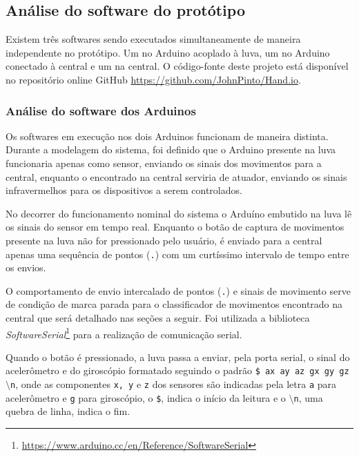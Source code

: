 \subsection{Análise do software do protótipo}

Existem três softwares sendo executados simultaneamente de maneira independente no protótipo. Um no Arduino acoplado à luva, um no Arduino conectado à central e um na central. O código-fonte deste projeto está disponível no repositório online GitHub \url{https://github.com/JohnPinto/Hand.io}.

\subsubsection{Análise do software dos Arduinos}

Os softwares em execução nos dois Arduinos funcionam de maneira distinta. Durante a modelagem do sistema, foi definido que o Arduino presente na luva funcionaria apenas como sensor, enviando os sinais dos movimentos para a central,  enquanto o encontrado na central serviria de atuador, enviando os sinais infravermelhos para os dispositivos a serem controlados.

No decorrer do funcionamento nominal do sistema o Arduíno embutido na luva lê os sinais do sensor em tempo real. Enquanto o botão de captura de movimentos presente na luva não for pressionado pelo usuário, é enviado para a central apenas uma sequência de pontos (\texttt{.}) com um curtíssimo intervalo de tempo entre os envios. 

O comportamento de envio intercalado de pontos (\texttt{.}) e sinais de movimento serve de condição de marca parada para o classificador de movimentos encontrado na central que será detalhado nas seções a seguir. Foi utilizada a biblioteca \textit{SoftwareSerial}\footnote{\url{https://www.arduino.cc/en/Reference/SoftwareSerial}\label{ftnote:serial}} para a realização de comunicação serial.

Quando o botão é pressionado, a luva passa a enviar, pela porta serial, o sinal do acelerômetro e do giroscópio formatado  seguindo o padrão \texttt{\$    ax    ay    az    gx    gy    gz    $\setminus $n}, onde as componentes \texttt{x, y} e \texttt{z} dos sensores são indicadas pela letra \texttt{a} para acelerômetro e \texttt{g} para giroscópio, o \texttt{\$}, indica o início da leitura e o \texttt{$\setminus $n}, uma quebra de linha, indica o fim. 


